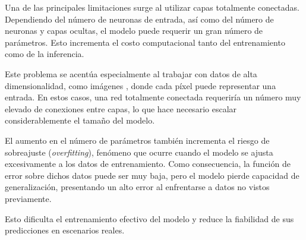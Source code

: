Una de las principales limitaciones surge al utilizar capas totalmente conectadas.
Dependiendo del número de neuronas de entrada, así como del número de neuronas y capas
ocultas, el modelo puede requerir un gran número de parámetros. Esto incrementa el costo
computacional tanto del entrenamiento como de la inferencia.

Este problema se acentúa especialmente al trabajar con datos de alta dimensionalidad,
como imágenes \parencite{o2015introduction}, donde cada píxel puede representar una entrada. En estos casos, una red
totalmente conectada requeriría un número muy elevado de conexiones entre capas,
lo que hace necesario escalar considerablemente el tamaño del modelo.
\medskip

El aumento en el número de parámetros también incrementa el riesgo de sobreajuste
(\textit{overfitting}), fenómeno que ocurre cuando el modelo se ajusta excesivamente
a los datos de entrenamiento. Como consecuencia, la función de error sobre dichos datos
puede ser muy baja, pero el modelo pierde capacidad de generalización, presentando un
alto error al enfrentarse a datos no vistos previamente.

Esto dificulta el entrenamiento efectivo del modelo y reduce la fiabilidad de sus
predicciones en escenarios reales.
